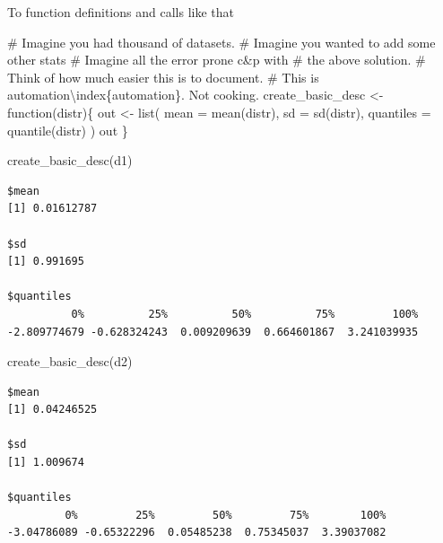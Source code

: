 \documentclass[
  12pt,
  letterpaper,
]{krantz}
\newenvironment{Shaded}{\begin{snugshade}}{\end{snugshade}}
\newcommand{\AttributeTok}[1]{\textcolor[rgb]{0.40,0.45,0.13}{#1}}
\newcommand{\CommentTok}[1]{\textcolor[rgb]{0.37,0.37,0.37}{#1}}
\newcommand{\ControlFlowTok}[1]{\textcolor[rgb]{0.00,0.23,0.31}{#1}}
\newcommand{\FunctionTok}[1]{\textcolor[rgb]{0.28,0.35,0.67}{#1}}
\newcommand{\NormalTok}[1]{\textcolor[rgb]{0.00,0.23,0.31}{#1}}
\newcommand{\OtherTok}[1]{\textcolor[rgb]{0.00,0.23,0.31}{#1}}
\begin{document}
To function definitions and calls like that

\begin{Shaded}
\begin{Highlighting}[]
\CommentTok{\# Imagine you had thousand of datasets.}
\CommentTok{\# Imagine you wanted to add some other stats}
\CommentTok{\# Imagine all the error prone c\&p with }
\CommentTok{\# the above solution. }
\CommentTok{\# Think of how much easier this is to document. }
\CommentTok{\# This is automation\textbackslash{}index\{automation\}. Not cooking. }
\NormalTok{create\_basic\_desc }\OtherTok{\textless{}{-}} \ControlFlowTok{function}\NormalTok{(distr)\{}
\NormalTok{  out }\OtherTok{\textless{}{-}} \FunctionTok{list}\NormalTok{(}
    \AttributeTok{mean =} \FunctionTok{mean}\NormalTok{(distr),}
    \AttributeTok{sd =} \FunctionTok{sd}\NormalTok{(distr),}
    \AttributeTok{quantiles =} \FunctionTok{quantile}\NormalTok{(distr)}
\NormalTok{  )}
\NormalTok{  out}
\NormalTok{\}}
\end{Highlighting}
\end{Shaded}

\begin{Shaded}
\begin{Highlighting}[]
\FunctionTok{create\_basic\_desc}\NormalTok{(d1)}
\end{Highlighting}
\end{Shaded}

\begin{verbatim}
$mean
[1] 0.01612787

$sd
[1] 0.991695

$quantiles
          0%          25%          50%          75%         100% 
-2.809774679 -0.628324243  0.009209639  0.664601867  3.241039935 
\end{verbatim}

\begin{Shaded}
\begin{Highlighting}[]
\FunctionTok{create\_basic\_desc}\NormalTok{(d2)}
\end{Highlighting}
\end{Shaded}

\begin{verbatim}
$mean
[1] 0.04246525

$sd
[1] 1.009674

$quantiles
         0%         25%         50%         75%        100% 
-3.04786089 -0.65322296  0.05485238  0.75345037  3.39037082 
\end{verbatim}
\end{document}
